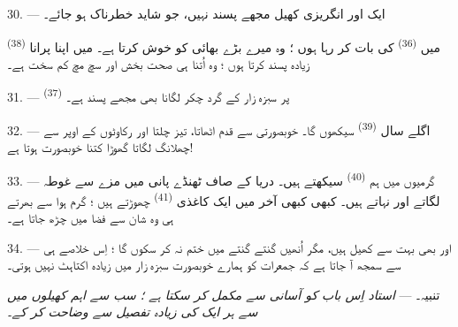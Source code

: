 30. --- ایک اور انگریزی کھیل مجھے پسند نہیں، جو شاید خطرناک ہو جائے۔

میں \textsuperscript{(36)} کی بات کر رہا ہوں ؛ وہ میرے
بڑے بھائی کو خوش کرتا ہے۔ میں اپنا پرانا \textsuperscript{(38)} زیادہ پسند کرتا ہوں ؛ وہ اُتنا ہی صحت
بخش اور سچ مچ کم سخت ہے۔

\VUsaut{4.6mm}
\VUsaut{3.0mm}

31. --- \textsuperscript{(37)} پر سبزہ زار کے گرد چکر
لگانا بھی مجھے پسند ہے۔

32. --- اگلے سال \textsuperscript{(39)} سیکھوں گا۔
خوبصورتی سے قدم اٹھاتا، تیز چلتا اور رکاوٹوں کے اوپر سے چھلانگ لگاتا
گھوڑا کتنا خوبصورت ہوتا ہے!

33. --- گرمیوں میں ہم \textsuperscript{(40)} سیکھتے
ہیں۔ دریا کے صاف ٹھنڈے پانی میں مزے سے غوطہ لگاتے اور نہاتے ہیں۔
کبھی کبھی آخر میں ایک کاغذی \textsuperscript{(41)}
چھوڑتے ہیں ؛ گرم ہوا سے بھرتے ہی وہ شان سے فضا میں چڑھ جاتا ہے۔

34. --- اور بھی بہت سے کھیل ہیں، مگر اُنھیں گنتے گنتے میں ختم نہ کر
سکوں گا ؛ اِس خلاصے ہی سے سمجھ آ جاتا ہے کہ جمعرات کو ہمارے خوبصورت
سبزہ زار میں زیادہ اکتاہٹ نہیں ہوتی۔

تنبیہ۔ --- \textit{استاد اِس باب کو آسانی سے مکمل کر سکتا ہے ؛ سب سے}
\textit{اہم کھیلوں میں سے ہر ایک کی زیادہ تفصیل سے وضاحت کر کے۔}
